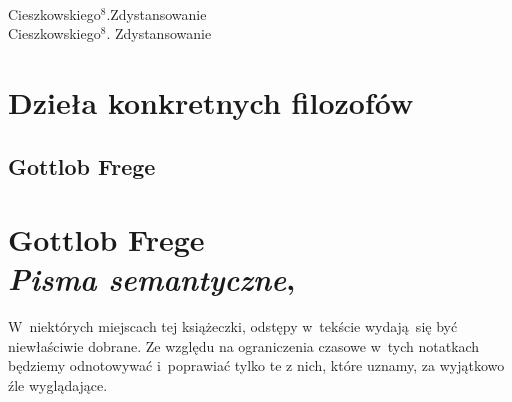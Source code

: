 \documentclass[a4paper,11pt]{article}
\numberwithin{equation}{section}
\begin{document}
\VerSpaceTwo


\noindent
{} \\
\Jest Cieszkowskiego$^{ 8 }$.Zdystansowanie \\
\PowinnoByc Cieszkowskiego$^{ 8 }$. Zdystansowanie \\














\newpage

\section{Dzieła konkretnych filozofów}

\VerSpaceTwo





\subsection{Gottlob Frege}

\VerSpaceTwo


\section{Gottlob Frege \\
  \textit{Pisma semantyczne},
  \parencite{FregePismaSemantyczne1977}}


\vspace{0em}



\vspace{0em}


\noindent
W~niektórych miejscach tej książeczki, odstępy w~tekście wydają~się być
niewłaściwie dobrane. Ze względu na ograniczenia czasowe w~tych notatkach
będziemy odnotowywać i~poprawiać tylko te z nich, które uznamy, za
wyjątkowo źle wyglądające.

\VerSpaceFour
\end{document}
